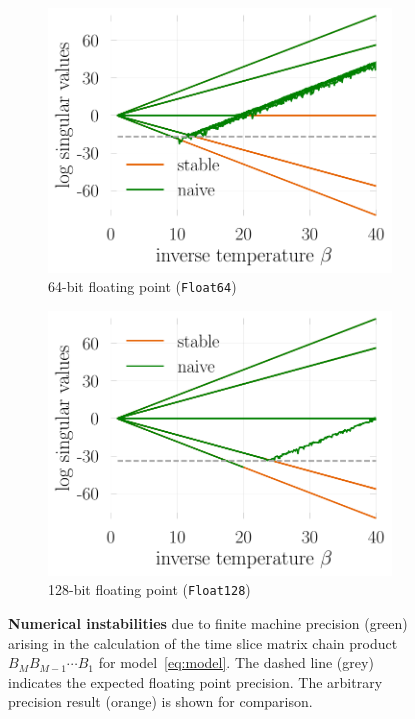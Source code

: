 \documentclass[submission, Phys]{SciPost}
\begin{document}
\begin{figure}
	\centering
	\begin{subfigure}{0.48\textwidth}
		\includegraphics[width=\textwidth]{figures/naive_vs_stable.pdf}
		\caption{64-bit floating point (\texttt{Float64}) \label{fig:naive_vs_stable_float64}}
	\end{subfigure}%
	\hspace{10pt}
	\begin{subfigure}{0.48\textwidth}
		\includegraphics[width=\textwidth]{figures/naive_vs_stable_float128.pdf}
		\caption{128-bit floating point (\texttt{Float128}) \label{fig:naive_vs_stable_float128}}
	\end{subfigure}
	\vspace{5pt}
	\caption[MyCaption]{\textbf{Numerical instabilities} due to finite machine precision (green) arising in the calculation of the time slice matrix chain product $B_M B_{M-1} \cdots B_1$ for model~\eqref{eq:model}. The dashed line (grey) indicates the expected floating point precision\protect\footnotemark. The arbitrary precision result (orange) is shown for comparison.}
	\label{fig:naive_vs_stable}
\end{figure}
\end{document}
